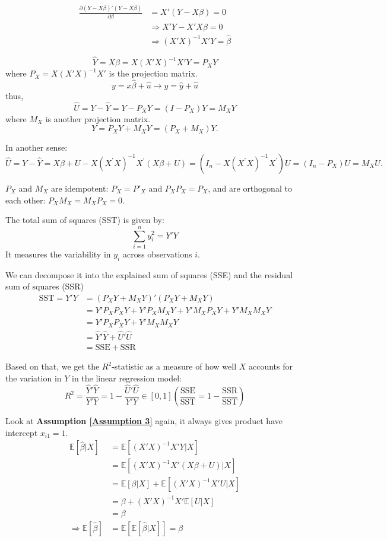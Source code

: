 \begin{align*}
  \frac{\partial (Y - X \beta)'(Y - X \beta)}{\partial \beta} &= X'(Y - X
  \beta) = 0\\
  &\Rightarrow X'Y - X'X\beta = 0\\
  &\Rightarrow (X'X)^{-1}X'Y = \hat{\beta}
\end{align*}

\[ \hat{Y} = X\hat{\beta} = X(X'X)^{-1}X'Y = P_X Y \]
where $P_X = X(X'X)^{-1}X'$ is the projection matrix.
\[ y = x\hat{\beta} + \hat{u} \rightarrow y = \hat{y} + \hat{u} \]
thus,
\[ \hat{U} = Y - \hat{Y} = Y - P_X Y = (I - P_X)Y = M_X Y \]
where $M_X$ is another projection matrix.
\[ Y = P_X Y + M_X Y = (P_X + M_X)Y. \]

In another sense:
\[\hat{U} = Y - \hat{Y} = X\beta + U - X(X^{\prime} X)^{-1}X^{\prime}(X \beta +U) = (I_n - X(X^{\prime} X)^{-1}X^{\prime})U = (I_n - P_X)U = M_{X} U.\]

$P_X$ and $M_X$ are idempotent: $P_X = P'_X$ and $P_X P_X = P_X$, and are orthogonal to each other: $P_X M_X = M_X P_X = 0$.

The total sum of squares (SST) is given by:
\[ \sum_{i = 1}^n y_i^2 = Y'Y \]
It measures the variability in $y_i$ across observations $i$.

We can decompose it into the explained sum of squares (SSE) and the residual sum of squares (SSR)
\begin{align*}
  \text{SST} = Y'Y &= (P_X Y + M_X Y)'(P_X Y + M_X Y)\\
  &= Y'P_X P_X Y + Y'P_X M_X Y + Y'M_X P_X Y + Y'M_X M_X Y \\
  &= Y'P_X P_X Y + Y'M_X M_X Y\\
  &= \hat{Y}'\hat{Y} + \hat{U}'\hat{U}\\
  &= \text{SSE} + \text{SSR}
\end{align*}

Based on that, we get the $R^2$-statistic as a measure of how well $X$ accounts for the variation in $Y$ in the linear regression model:
\[ R^2 = \frac{\hat{Y}'\hat{Y}}{Y'Y} = 1 - \frac{\hat{U}'\hat{U}}{Y'Y}
   \in [0, 1] \left(\frac{\text{SSE}}{\text{SST}} = 1 - \frac{\text{SSR}}{\text{SST}}\right) \]

Look at \textbf{Assumption \ref{Assumption 3}} again, it always gives product have intercept $x_{i1} = 1$.
\begin{align*}
  \mathbb{E}[\hat{\beta} | X] &= \mathbb{E}[(X'X)^{-1}X'Y | X]\\
  &= \mathbb{E}[(X'X)^{-1}X'(X\beta + U) | X]\\
  &= \mathbb{E}[\beta | X] + \mathbb{E}[(X'X)^{-1}X'U | X]\\
  &= \beta + (X'X)^{-1}X'\mathbb{E}[U | X]\\
  &= \beta\\
  \Rightarrow \mathbb{E}[\hat{\beta}] &= \mathbb{E}[\mathbb{E}[\hat{\beta} | X]] = \beta
\end{align*}

